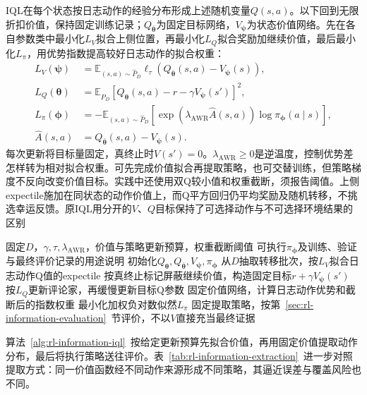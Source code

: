 IQL在每个状态按日志动作的经验分布形成上述随机变量$Q(s,a)$。以下回到无限折扣价值，保持固定训练记录；$Q_{\bar{\bm\theta}}$为固定目标网络，$V_{\bm\psi}$为状态价值网络。先在各自参数类中最小化$L_V$拟合上侧位置，再最小化$L_Q$拟合奖励加继续价值，最后最小化$L_\pi$，用优势指数提高较好日志动作的拟合权重：
\begin{align}
  \label{eq:rl-information-iql}
  L_V(\bm\psi)
    &=\mathbb E_{(s,a)\sim\widehat P_D}
       \ell_\tau(Q_{\bar{\bm\theta}}(s,a)-V_{\bm\psi}(s)),\nonumber\\
  L_Q(\bm\theta)
    &=\mathbb E_{\widehat P_D}
       [Q_{\bm\theta}(s,a)-r-\gamma V_{\bm\psi}(s')]^2,\nonumber\\
  L_\pi(\bm\phi)
    &=-\mathbb E_{(s,a)\sim\widehat P_D}
       [\exp(\lambda_{\mathrm{AWR}}\widehat A(s,a))\log\pi_{\bm\phi}(a\mid s)],\\
  \widehat A(s,a)&=Q_{\bar{\bm\theta}}(s,a)-V_{\bm\psi}(s).
  \nonumber
\end{align}
每次更新将目标量固定，真终止时$V(s')=0$。$\lambda_{\mathrm{AWR}}\geq0$是逆温度，控制优势差怎样转为相对拟合权重。可先完成价值拟合再提取策略，也可交替训练，但策略梯度不反向改变价值目标。实践中还使用双Q较小值和权重截断，须报告阈值。上侧expectile施加在同状态的动作价值上，而Q平方回归仍平均奖励及随机转移，不挑选幸运反馈。原IQL用分开的$V$、$Q$目标保持了可选择动作与不可选择环境结果的区别

\begin{algorithm}[固定经验上的IQL与策略提取]
  \label{alg:rl-information-iql}
  \begin{algorithmic}[1]
    \Require 固定$D$，$\gamma,\tau,\lambda_{\mathrm{AWR}}$，价值与策略更新预算，权重截断阈值
    \Ensure 可执行$\pi_{\bm\phi}$及训练、验证与最终评价记录的用途说明
    \State 初始化$Q_{\bm\theta},Q_{\bar{\bm\theta}},V_{\bm\psi},\pi_{\bm\phi}$
      \State 从$D$抽取转移批次，按$L_V$拟合日志动作Q值的expectile
      \State 按真终止标记屏蔽继续价值，构造固定目标$r+\gamma V_{\bm\psi}(s')$
      \State 按$L_Q$更新评论家，再缓慢更新目标Q参数
    \EndFor
      \State 固定价值网络，计算日志动作优势和截断后的指数权重
      \State 最小化加权负对数似然$L_\pi$
    \EndFor
    \State 固定提取策略，按第~\ref{sec:rl-information-evaluation}~节评价，不以$V$直接充当最终证据
  \end{algorithmic}
\end{algorithm}

算法~\ref{alg:rl-information-iql}~按给定更新预算先拟合价值，再用固定价值提取动作分布，最后将执行策略送往评价。表~\ref{tab:rl-information-extraction}~进一步对照提取方式：同一价值函数经不同动作来源形成不同策略，其逼近误差与覆盖风险也不同。

